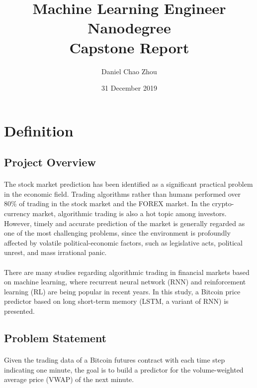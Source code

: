 \documentclass[12pt, letterpaper]{article}
\title{Machine Learning Engineer Nanodegree\\Capstone Report}
\author{Daniel Chao Zhou}
\date{31 December 2019}
\begin{document}
\maketitle

\section{Definition} %

\subsection{Project Overview}

\paragraph{}
The stock market prediction has been identified as a significant practical problem in the economic field. Trading algorithms rather than humans performed over 80\% of trading in the stock market and the FOREX market. In the crypto-currency market, algorithmic trading is also a hot topic among investors. However, timely and accurate prediction of the market is generally regarded as one of the most challenging problems, since the environment is profoundly affected by volatile political-economic factors, such as legislative acts, political unrest, and mass irrational panic.

\paragraph{}
There are many studies regarding algorithmic trading in financial markets based on machine learning, where recurrent neural network (RNN) and reinforcement learning (RL) are being popular in recent years. In this study, a Bitcoin price predictor based on long short-term memory (LSTM, a variant of RNN) is presented.

\subsection{Problem Statement}

\paragraph{}
Given the trading data of a Bitcoin futures contract with each time step indicating one minute, the goal is to build a predictor for the volume-weighted average price (VWAP) of the next minute.
\end{document}
